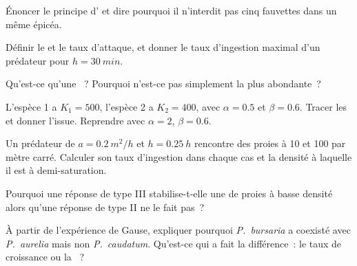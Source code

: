 \begin{exercise}[$\star$]\label{exo:b1:species-interactions:2}
Énoncer le principe d' et dire pourquoi il
n'interdit pas cinq fauvettes dans un même épicéa.
\end{exercise}

\begin{exercise}[$\star$]\label{exo:b1:species-interactions:3}
Définir le  et le taux d'attaque, et donner le
taux d'ingestion maximal d'un prédateur pour $h = \qty{30}{min}$.
\end{exercise}

\begin{exercise}[$\star$]\label{exo:b1:species-interactions:4}
Qu'est-ce qu'une ~? Pourquoi n'est-ce pas simplement
la plus abondante~?
\end{exercise}

\begin{exercise}[$\star\star$]\label{exo:b1:species-interactions:5}
L'espèce 1 a $K_1 = 500$, l'espèce 2 a $K_2 = 400$, avec $\alpha =
0.5$ et $\beta = 0.6$. Tracer les  et donner l'issue.
Reprendre avec $\alpha = 2$, $\beta = 0.6$.
\end{exercise}

\begin{exercise}[$\star\star$]\label{exo:b1:species-interactions:6}
Un prédateur de $a = \qty{0.2}{m^2/h}$ et $h = \qty{0.25}{h}$ rencontre
des proies à \qty{10}{} et \qty{100}{} par mètre carré. Calculer son
taux d'ingestion dans chaque cas et la densité à laquelle il est à
demi-saturation.
\end{exercise}

\begin{exercise}[$\star\star$]\label{exo:b1:species-interactions:7}
Pourquoi une réponse de type III stabilise-t-elle une  de
proies à basse densité alors qu'une réponse de type II ne le fait pas~?
\end{exercise}

\begin{exercise}[$\star\star$]\label{exo:b1:species-interactions:8}
À partir de l'expérience de Gause, expliquer pourquoi \emph{P.~bursaria}
a coexisté avec \emph{P.~aurelia} mais non \emph{P.~caudatum}. Qu'est-ce
qui a fait la différence~: le taux de croissance ou la ~?
\end{exercise}

